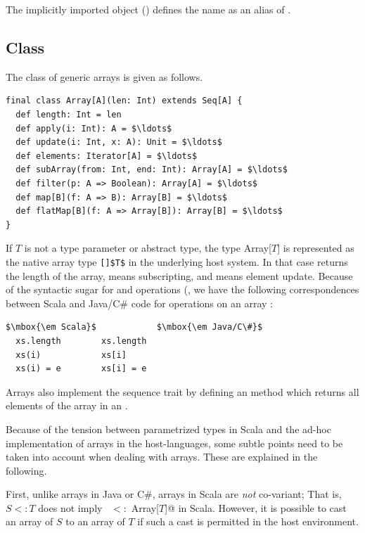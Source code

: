 The implicitly imported  object () defines the name 
 as an alias of .

\subsection{Class \large{}}\label{cls:array}

The class of generic arrays is given as follows.

\begin{lstlisting}
final class Array[A](len: Int) extends Seq[A] {
  def length: Int = len
  def apply(i: Int): A = $\ldots$
  def update(i: Int, x: A): Unit = $\ldots$
  def elements: Iterator[A] = $\ldots$
  def subArray(from: Int, end: Int): Array[A] = $\ldots$
  def filter(p: A => Boolean): Array[A] = $\ldots$
  def map[B](f: A => B): Array[B] = $\ldots$
  def flatMap[B](f: A => Array[B]): Array[B] = $\ldots$
}
\end{lstlisting}
If $T$ is not a type parameter or abstract type, the type Array[$T$]
is represented as the native array type \lstinline{[]$T$} in the
underlying host system. In that case  returns
the length of the array,  means subscripting, and
 means element update. Because of the syntactic sugar for
 and
 operations (,
we have the following correspondences between Scala and Java/C\# code for
operations on an array :

\begin{lstlisting}
$\mbox{\em Scala}$            $\mbox{\em Java/C\#}$
  xs.length        xs.length
  xs(i)            xs[i]
  xs(i) = e        xs[i] = e
\end{lstlisting}

Arrays also implement the sequence trait 
by defining an  method which returns
all elements of the array in an .

Because of the tension between parametrized types in Scala and the ad-hoc
implementation of arrays in the host-languages, some subtle points
need to be taken into account when dealing with arrays. These are
explained in the following.

First, unlike arrays in Java or C\#, arrays in Scala are {\em not}
co-variant; That is, $S <: T$ does not imply 
~\lstinline@Array[$S$] $<:$ Array[$T$]@ in Scala.  
However, it is possible to cast an array
of $S$ to an array of $T$ if such a cast is permitted in the host
environment.

